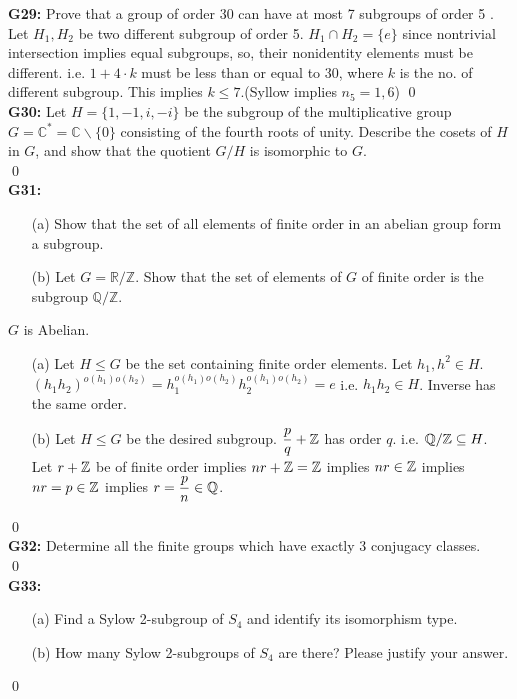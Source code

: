 \textbf{G29:} Prove that a group of order 30 can have at most 7 subgroups of order 5 .
\soln
Let $ H_1,H_2 $ be two different subgroup of order 5. $ H_1\cap H_2 = \{e\}$ since nontrivial intersection implies equal subgroups, so, their nonidentity elements must be different. i.e. $ 1+4\cdot k $ must be less than or equal to $ 30 $, where $ k $ is the no. of different subgroup. This implies $ k\le 7 $.(Syllow implies $ n_5=1,6 $)
\qed\\

\textbf{G30:} Let $H=\{1,-1, i,-i\}$ be the subgroup of the multiplicative group $G=\mathbb{C}^{*}=\mathbb{C} \backslash\{0\}$ consisting of the fourth roots of unity. Describe the cosets of $H$ in $G$, and show that the quotient $G / H$ is isomorphic to $G$.\\
\soln
\qed\\

\textbf{G31:} 
\begin{itemize}
	\item[(a)] Show that the set of all elements of finite order in an abelian group form a subgroup.
	\item[(b)] Let $G=\mathbb{R} / \mathbb{Z}$. Show that the set of elements of $G$ of finite order is the subgroup $\mathbb{Q} / \mathbb{Z}$.
\end{itemize}
\soln $ G  $ is Abelian.\\

\begin{itemize}
	\item[(a)] Let $ H\le G $ be the set containing finite order elements. Let $ h_1,h^2\in H $. $ (h_1h_2)^{o(h_1)o(h_2)}=h_1^{o(h_1)o(h_2)}h_2^{o(h_1)o(h_2)}=e $ i.e. $ h_1h_2 \in H$. Inverse has the same order.
	\item[(b)] Let $ H\le G $ be the desired subgroup. $ \dfrac{p}{q} + \mathbb{Z} $ has order $ q $. i.e. $ \mathbb{Q}/\mathbb{Z}\subseteq H $.\\
	Let $ r+ \mathbb{Z} $ be of finite order implies $ nr + \mathbb{Z} =\mathbb{Z} $ implies $ nr\in \mathbb{Z} $ implies $ nr = p\in \mathbb{Z} $ implies $ r= \dfrac{p}{n} \in \mathbb{Q}$.
\end{itemize}
\qed\\

\textbf{G32:} Determine all the finite groups which have exactly 3 conjugacy classes.\\
\soln
\qed\\

\textbf{G33:} \begin{itemize}
	\item[(a)] Find a Sylow 2-subgroup of $S_{4}$ and identify its isomorphism type.
	\item[(b)] How many Sylow 2-subgroups of $S_{4}$ are there? Please justify your answer.
\end{itemize}
\soln
\qed\\


